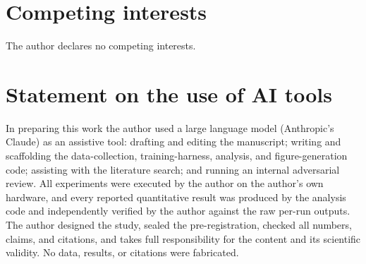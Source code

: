 \documentclass{article}
\begin{document}
\section*{Competing interests}
The author declares no competing interests.

\section*{Statement on the use of AI tools}
In preparing this work the author used a large language model (Anthropic's Claude) as an
assistive tool: drafting and editing the manuscript; writing and scaffolding the
data-collection, training-harness, analysis, and figure-generation code; assisting with the
literature search; and running an internal adversarial review. All experiments were executed by
the author on the author's own hardware, and every reported quantitative result was produced by
the analysis code and independently verified by the author against the raw per-run outputs. The
author designed the study, sealed the pre-registration, checked all numbers, claims, and
citations, and takes full responsibility for the content and its scientific validity. No data,
results, or citations were fabricated.



\end{document}
